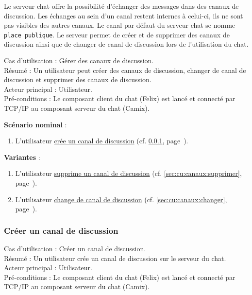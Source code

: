 Le serveur chat offre la possibilité d'échanger des messages dans des canaux de discussion. 
Les échanges au sein d'un canal restent internes à celui-ci, ils ne sont pas visibles des autres canaux. Le canal par défaut du serveur chat se nomme \texttt{place publique}. Le serveur permet de créer et de supprimer des canaux de discussion ainsi que de changer de canal de discussion lors de l'utilisation du chat.

\medskip
\noindent
Cas d'utilisation : Gérer des canaux de discussion.\\
Résumé : Un utilisateur peut créer des canaux de discussion, changer de canal de discussion et supprimer des canaux de discussion. \\
Acteur principal : Utilisateur.\\
Pré-conditions : Le composant client du chat (Felix) est lancé et connecté par TCP/IP au composant serveur du chat (Camix).

\medskip
\textbf{Scénario nominal} :
\begin{enumerate}
\item L'utilisateur \underline{crée un canal de discussion} (cf. \ref{sec:cu:canaux:creer}, page~\pageref{sec:cu:canaux:creer}).
\end{enumerate}

\medskip
\textbf{Variantes} :
\begin{enumerate}
\item[1.a] L'utilisateur \underline{supprime un canal de discussion} (cf. \ref{sec:cu:canaux:supprimer}, page~\pageref{sec:cu:canaux:supprimer}).
\item[1.b] L'utilisateur \underline{change de canal de discussion} (cf. \ref{sec:cu:canaux:changer}, page~\pageref{sec:cu:canaux:changer}).
\end{enumerate}


\subsubsection{Créer un canal de discussion}
\label{sec:cu:canaux:creer}

\noindent 
Cas d'utilisation : Créer un canal de discussion.\\
Résumé : Un utilisateur crée un canal de discussion sur le serveur du chat.\\
Acteur principal : Utilisateur.\\
Pré-conditions : Le composant client du chat (Felix) est lancé et connecté par TCP/IP au composant serveur du chat (Camix).


